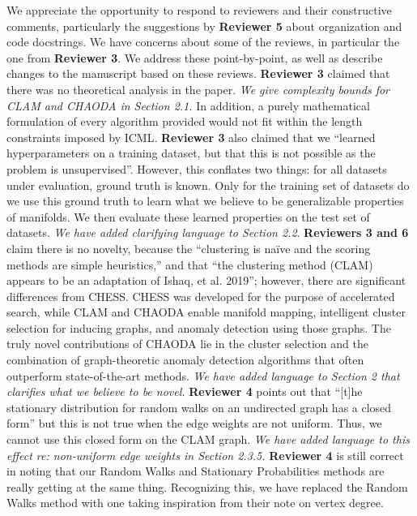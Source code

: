 \documentclass{article}
\begin{document}
We appreciate the opportunity to respond to reviewers and their constructive comments, particularly the suggestions by \textbf{Reviewer 5} about organization and code docstrings.
We have concerns about some of the reviews, in particular the one from \textbf{Reviewer 3}.
We address these point-by-point, as well as describe changes to the manuscript based on these reviews.
\textbf{Reviewer 3} claimed that there was no theoretical analysis in the paper.
\emph{We give complexity bounds for CLAM and CHAODA in Section 2.1.}
In addition, a purely mathematical formulation of every algorithm provided would not fit within the length constraints imposed by ICML.
\textbf{Reviewer 3} also claimed that we ``learned hyperparameters on a training dataset, but that this is not possible as the problem is unsupervised''.
However, this conflates two things: for all datasets under evaluation, ground truth is known.
Only for the training set of datasets do we use this ground truth to learn what we believe to be generalizable properties of manifolds.
We then evaluate these learned properties on the test set of datasets.
\emph{We have added clarifying language to Section 2.2}.
\textbf{Reviewers 3 and 6} claim there is no novelty, because the ``clustering is na\"ive and the scoring methods are simple heuristics,'' and that ``the clustering method (CLAM) appears to be an adaptation of Ishaq, et al. 2019'';
however, there are significant differences from CHESS.
CHESS was developed for the purpose of accelerated search, while CLAM and CHAODA enable manifold mapping, intelligent cluster selection for inducing graphs, and anomaly detection using those graphs.
The truly novel contributions of CHAODA lie in the cluster selection and the combination of graph-theoretic anomaly detection algorithms that often outperform state-of-the-art methods.
\emph{We have added language to Section 2 that clarifies what we believe to be novel.}
\textbf{Reviewer 4} points out that ``[t]he stationary distribution for random walks on an undirected graph has a closed form'' but this is not true when the edge weights are not uniform.
Thus, we cannot use this closed form on the CLAM graph.
\emph{We have added language to this effect re: non-uniform edge weights in Section 2.3.5.}
\textbf{Reviewer 4} is still correct in noting that our Random Walks and Stationary Probabilities methods are really getting at the same thing.
Recognizing this, we have replaced the Random Walks method with one taking inspiration from their note on vertex degree.
\end{document}
